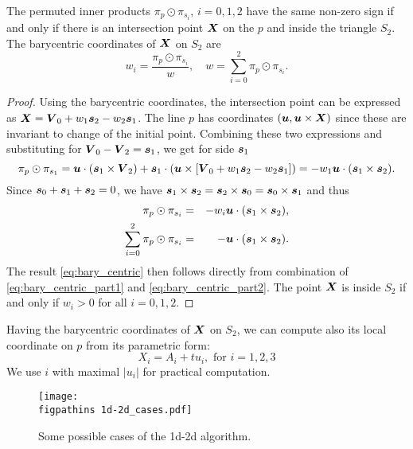 \begin{lemma}
\label{lemma_barycentric}
The permuted inner products $\pi_p \odot \pi_{s_i},\, i=0,1,2$ have the same non-zero sign if and only if there
is an intersection point $\mathbf{\boldsymbol{X}}$ on the $p$ and inside the triangle $S_2$. 
The barycentric coordinates of $\mathbf{\boldsymbol{X}}$ on $S_2$ are
\begin{equation}
  \label{eq:bary_centric}
   w_i = \frac{\pi_p \odot \pi_{s_i}}{w},\quad w=\sum_{i=0}^{2} \pi_p \odot \pi_{s_i}.
\end{equation}
\end{lemma}
\begin{proof}
Using the barycentric coordinates, the intersection point can be expressed as $\mathbf{\boldsymbol{X}} = \mathbf{\boldsymbol{V}}_0 + w_1 \mathbf{\boldsymbol{s}}_2 - w_2 \mathbf{\boldsymbol{s}}_1$.
The line $p$ has \plucker coordinates $(\mathbf{\boldsymbol{u}}, \mathbf{\boldsymbol{u}} \times \mathbf{\boldsymbol{X}})$ since these are invariant to change of the initial point. 
Combining these two expressions and substituting for $\mathbf{\boldsymbol{V}}_0-\mathbf{\boldsymbol{V}}_2=\mathbf{\boldsymbol{s}}_1$, we get for side $\mathbf{\boldsymbol{s}}_1$
\[
   \pi_p \odot \pi_{s_1} = \mathbf{\boldsymbol{u}} \cdot (\mathbf{\boldsymbol{s}}_1 \times \mathbf{\boldsymbol{V}}_2) + \mathbf{\boldsymbol{s}}_1 \cdot ( \mathbf{\boldsymbol{u}} \times [\mathbf{\boldsymbol{V}}_0 + w_1\mathbf{\boldsymbol{s}}_2 - w_2 \mathbf{\boldsymbol{s}}_1])
   =-w_1 \mathbf{\boldsymbol{u}} \cdot (\mathbf{\boldsymbol{s}}_1 \times \mathbf{\boldsymbol{s}}_2).
\]
Since $\mathbf{\boldsymbol{s}}_0 + \mathbf{\boldsymbol{s}}_1 + \mathbf{\boldsymbol{s}}_2=0$, we have $ \mathbf{\boldsymbol{s}}_1 \times \mathbf{\boldsymbol{s}}_2 = \mathbf{\boldsymbol{s}}_2 \times \mathbf{\boldsymbol{s}}_0 = \mathbf{\boldsymbol{s}}_0 \times \mathbf{\boldsymbol{s}}_1$ and thus
\begin{eqnarray}
   \pi_p \odot \pi_{s_i} &=& -w_i \mathbf{\boldsymbol{u}} \cdot (\mathbf{\boldsymbol{s}}_1 \times \mathbf{\boldsymbol{s}}_2), \label{eq:bary_centric_part1}\\
   \sum_{i=0}^{2} \pi_p \odot \pi_{s_i} &=& - \mathbf{\boldsymbol{u}} \cdot (\mathbf{\boldsymbol{s}}_1 \times \mathbf{\boldsymbol{s}}_2). \label{eq:bary_centric_part2}
\end{eqnarray}
The result \eqref{eq:bary_centric} then follows directly from combination of \eqref{eq:bary_centric_part1} and \eqref{eq:bary_centric_part2}.
The point $\mathbf{\boldsymbol{X}}$ is inside $S_2$ if and only if $w_i>0$ for all $i=0,1,2$.
\end{proof}
Having the barycentric coordinates of $\mathbf{\boldsymbol{X}}$ on $S_2$, we can compute also its local coordinate on $p$ from its parametric form:
\begin{equation}
   \label{eq:line}
   X_i  = A_i + t u_i, \text{ for } i=1,2,3
\end{equation}
We use $i$ with maximal $|u_i|$ for practical computation. 

\begin{figure}[!htb]
    \centering
    \texttt{[image: \\figpathins 1d-2d\_cases.pdf]}
    \caption{Some possible cases of the 1d-2d algorithm.}
    \label{fig:1d2d_cases}
\end{figure}


